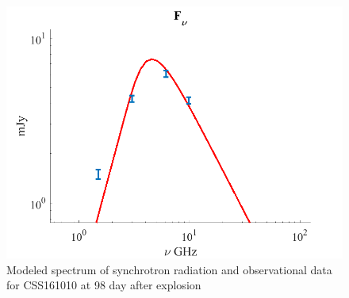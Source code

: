 \begin{figure}[h]
	\centering
	\includegraphics[width=12.5 cm]{./fig/synchrotron1.png} 
	\caption{Modeled spectrum of synchrotron radiation and observational data for CSS161010 at 98 day after explosion}
	\label{synchrotron1}
\end{figure}



	
